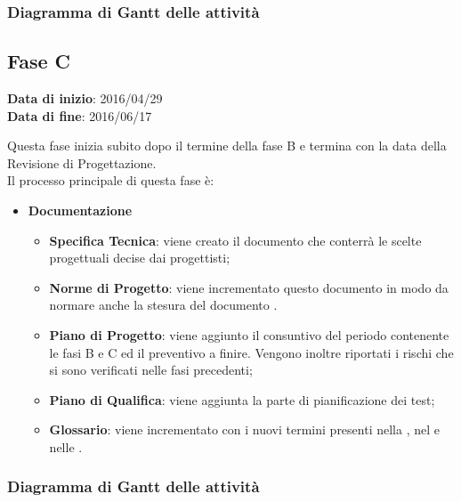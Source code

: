 		
		\subsubsection{Diagramma di Gantt delle attività}
		
	\subsection{Fase C}
	\begin{center}
		\textbf{Data di inizio}: 2016/04/29 \\
		\textbf{Data di fine}: 2016/06/17 \\
	\end{center}
	Questa fase inizia subito dopo il termine della fase B e termina con la data della Revisione di Progettazione. \\
	Il processo principale di questa fase è:
		\begin{itemize}
			\item \textbf{Documentazione}
			\att
			\begin{itemize}
				\item \textbf{Specifica Tecnica}: viene creato il documento \STdocRP che conterrà le scelte progettuali decise dai progettisti; %
				\item \textbf{Norme di Progetto}: viene incrementato questo documento in modo da normare anche la stesura del documento \STdocRP. %
				\item \textbf{Piano di Progetto}: viene aggiunto il consuntivo del periodo contenente le fasi B e C ed il preventivo a finire. Vengono inoltre riportati i rischi che si sono verificati nelle fasi precedenti;
				\item \textbf{Piano di Qualifica}: viene aggiunta la parte di pianificazione dei test;
				\item \textbf{Glossario}: viene incrementato con i nuovi termini presenti nella \STdocRP, nel \PQdocRP e nelle \NPdocRP.
			\end{itemize}
		\end{itemize}
		\subsubsection{Diagramma di Gantt delle attività}
		
		
		
